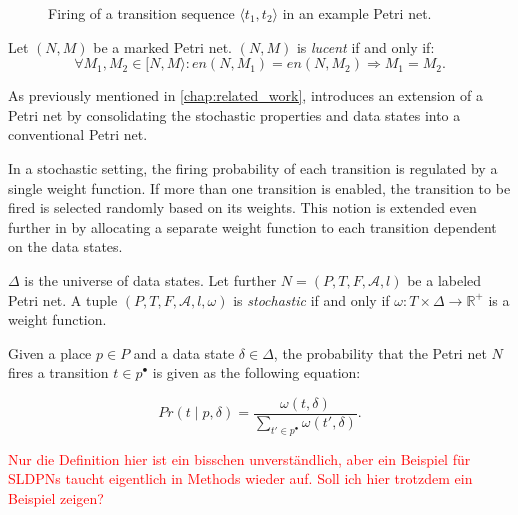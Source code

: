 \begin{figure}[ht!]
\begin{subfigure}[t]{0.31\textwidth}
    \end{subfigure}
    \caption{Firing of a transition sequence $\langle t_1, t_2 \rangle$ in an example Petri net.}
    \label{fig:firing_sequence}
\end{figure}

\begin{definition}[Lucency]
    Let $(N, M)$ be a marked Petri net. $(N, M)$ is \emph{lucent} if and only if:
    \[
        \forall M_1, M_2 \in [N, M \rangle: en(N, M_1) = en(N, M_2) \Rightarrow M_1 = M_2.
    \]
\end{definition}

As previously mentioned in \cref{chap:related_work}, \cite{sldpn} introduces an extension of a Petri net by consolidating the stochastic properties and data states into a conventional Petri net.

In a stochastic setting, the firing probability of each transition is regulated by a single weight function. If more than one transition is enabled, the transition to be fired is selected randomly based on its weights. This notion is extended even further in \cite{sldpn} by allocating a separate weight function to each transition dependent on the data states.

\begin{definition}
    $\Delta$ is the universe of data states. Let further $N = (P, T, F, \mathcal{A}, l)$ be a labeled Petri net. A tuple $(P, T, F, \mathcal{A}, l, \omega)$ is \emph{stochastic} if and only if $\omega: T \times \Delta \to \mathbb{R}^+$ is a weight function.
\end{definition}

Given a place $p \in P$ and a data state $\delta \in \Delta$, the probability that the Petri net $N$ fires a transition $t \in p^{\bullet}$ is given as the following equation:

\[
    Pr(t \mid p, \delta) = \frac{\omega(t, \delta)}{\sum_{t' \in p^{\bullet}} \omega(t', \delta)}.
\]

\textcolor{red}{Nur die Definition hier ist ein bisschen unverständlich, aber ein Beispiel für SLDPNs taucht eigentlich in Methods wieder auf. Soll ich hier trotzdem ein Beispiel zeigen?}

